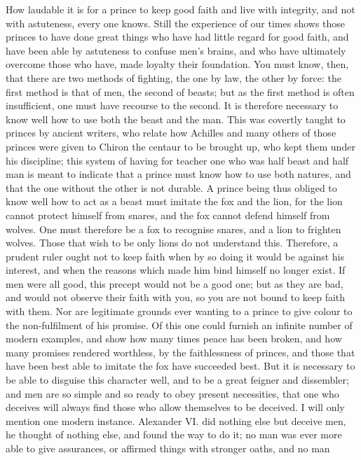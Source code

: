 \documentclass[12pt,letterpaper]{memoir}
\begin{document}
How laudable it is for a prince to keep good faith and live with
integrity, and not with astuteness, every one knows. Still the
experience of our times shows those princes to have done great things
who have had little regard for good faith, and have been able by
astuteness to confuse men's brains, and who have ultimately overcome
those who have, made loyalty their foundation. You must know, then,
that there are two methods of fighting, the one by law, the other by
force: the first method is that of men, the second of beasts; but as
the first method is often insufficient, one must have recourse to the
second. It is therefore necessary to know well how to use both the
beast and the man. This was covertly taught to princes by ancient
writers, who relate how Achilles and many others of those princes were
given to Chiron the centaur to be brought up, who kept them under his
discipline; this system of having for teacher one who was half beast
and half man is meant to indicate that a prince must know how to use
both natures, and that the one without the other is not durable. A
prince being thus obliged to know well how to act as a beast must
imitate the fox and the lion, for the lion cannot protect himself
from snares, and the fox cannot defend himself from wolves. One must
therefore be a fox to recognise snares, and a lion to frighten wolves.
Those that wish to be only lions do not understand this. Therefore,
a prudent ruler ought not to keep faith when by so doing it would be
against his interest, and when the reasons which made him bind himself
no longer exist. If men were all good, this precept would not be a
good one; but as they are bad, and would not observe their faith with
you, so you are not bound to keep faith with them. Nor are legitimate
grounds ever wanting to a prince to give colour to the non-fulfilment
of his promise. Of this one could furnish an infinite number of modern
examples, and show how many times peace has been broken, and how many
promises rendered worthless, by the faithlessness of princes, and those
that have been best able to imitate the fox have succeeded best. But
it is necessary to be able to disguise this character well, and to be
a great feigner and dissembler; and men are so simple and so ready to
obey present necessities, that one who deceives will always find those
who allow themselves to be deceived. I will only mention one modern
instance. Alexander VI. did nothing else but deceive men, he thought
of nothing else, and found the way to do it; no man was ever more able
to give assurances, or affirmed things with stronger oaths, and no man
\end{document}
